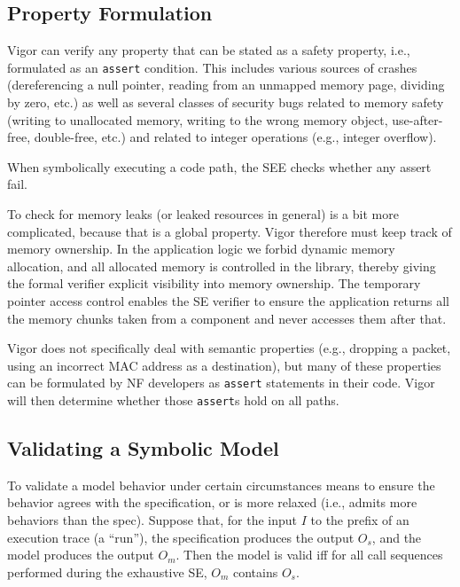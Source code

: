 \documentclass[letterpaper,twocolumn,10pt]{article}
\newcommand{\code}[1]{\lstinline{#1}}
\begin{document}
\subsection{Property Formulation}
\label{sec:properties}

Vigor can verify any property that can be stated as a safety property, i.e.,
formulated as an \code{assert} condition. This includes various sources of
crashes (dereferencing a null pointer, reading from an unmapped memory page,
dividing by zero, etc.) as well as several classes of security bugs related to
memory safety (writing to unallocated memory, writing to the wrong memory
object, use-after-free, double-free, etc.) and related to integer operations
(e.g., integer overflow).

When symbolically executing a code path, the SEE checks whether any assert fail.

To check for memory leaks (or leaked resources in general) is a bit more
complicated, because that is a global property. Vigor therefore must keep track
of memory ownership. In the application logic we forbid dynamic memory
allocation, and all allocated memory is controlled in the library, thereby
giving the formal verifier explicit visibility into memory ownership. The
temporary pointer access control enables the SE verifier to ensure the
application returns all the memory chunks taken from a component and never
accesses them after that.

Vigor does not specifically deal with semantic properties (e.g., dropping a
packet, using an incorrect MAC address as a destination), but many of these
properties can be formulated by NF developers as \code{assert} statements in
their code. Vigor will then determine whether those \code{assert}s hold on all
paths.

\subsection{Validating a Symbolic Model}
\label{sec:model-validation-criteria}

To validate a model behavior under certain circumstances means to ensure the
behavior agrees with the specification, or is more relaxed (i.e., admits more
behaviors than the spec). Suppose that, for the input \(I\) to the prefix of an
execution trace (a ``run''), the specification produces the output $O_s$, and
the model produces the output \(O_m\). Then the model is valid iff for all call
sequences performed during the exhaustive SE, \(O_m\) contains \(O_s\).
\end{document}
